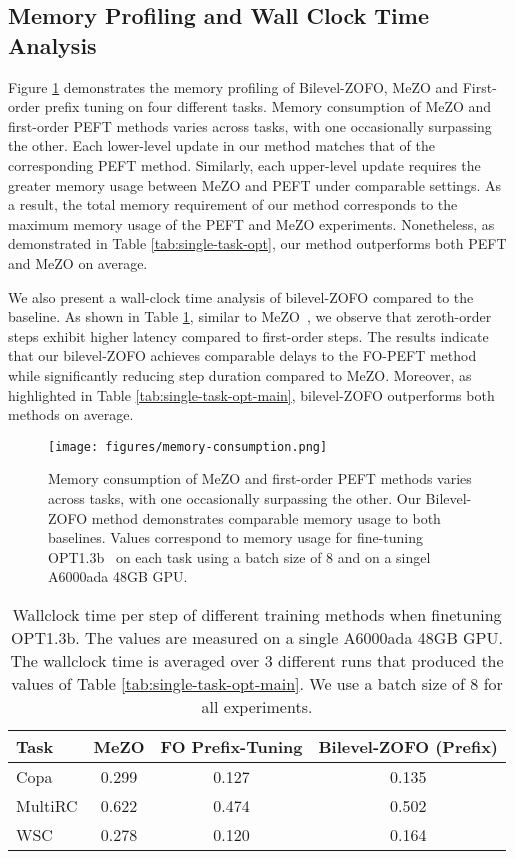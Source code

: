 \subsection{ Memory Profiling and Wall Clock Time Analysis}\label{sec:mem-profiling}
{
Figure \ref{fig:memory-profiling} demonstrates the memory profiling of Bilevel-ZOFO, MeZO and First-order prefix tuning on four different tasks. Memory consumption of MeZO and first-order PEFT methods varies across tasks, with one occasionally surpassing the other. Each lower-level update in our method matches that of the corresponding PEFT method. Similarly, each upper-level update requires the greater memory usage between MeZO and PEFT under comparable settings. As a result, the total memory requirement of our method corresponds to the maximum memory usage of the PEFT and MeZO experiments. Nonetheless, as demonstrated in Table \ref{tab:single-task-opt}, our method outperforms both PEFT and MeZO on average. 

We also present a wall-clock time analysis of bilevel-ZOFO compared to the baseline. As shown in Table \ref{tab:wall_clock_time}, similar to MeZO~\cite{MalladiGNDL0A23Mezo}, we observe that zeroth-order steps exhibit higher latency compared to first-order steps. The results indicate that our bilevel-ZOFO achieves comparable delays to the FO-PEFT method while significantly reducing step duration compared to MeZO. Moreover, as highlighted in Table \ref{tab:single-task-opt-main}, bilevel-ZOFO outperforms both methods on average.
}

\begin{figure}
    \centering
    \texttt{[image: figures/memory-consumption.png]}
    \caption{Memory consumption of MeZO and first-order PEFT methods varies across tasks, with one occasionally surpassing the other. Our Bilevel-ZOFO method demonstrates comparable memory usage to both baselines. Values correspond to memory usage for fine-tuning OPT1.3b~\cite{OPT} on each task using a batch size of 8 and on a singel A6000ada 48GB GPU.}
    \label{fig:memory-profiling}
\end{figure}

\begin{table}
    \centering
    \caption{Wallclock time per step of different training methods when finetuning OPT1.3b. The values are measured on a single A6000ada 48GB GPU. The wallclock time is averaged over 3 different runs that produced the values of Table \ref{tab:single-task-opt-main}. We use a batch size of 8 for all experiments.}
    \begin{tabular}{lccc}
        \toprule
        \textbf{Task} & \textbf{MeZO} & \textbf{FO Prefix-Tuning} & \textbf{Bilevel-ZOFO (Prefix)} \\
        \midrule
        Copa & 0.299 & 0.127 & 0.135 \\
        MultiRC & 0.622 & 0.474 & 0.502 \\
        WSC & 0.278 & 0.120 & 0.164 \\
        \bottomrule
    \end{tabular}
    \label{tab:wall_clock_time}
\end{table}


